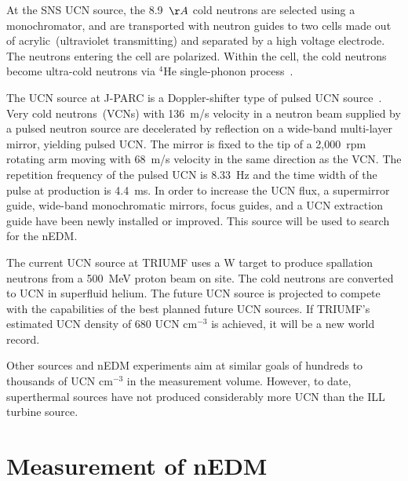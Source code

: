 At the SNS UCN source, the 8.9~$\AA$ cold neutrons are selected using
a monochromator, and are transported with neutron guides to two cells
made out of acrylic~(ultraviolet transmitting) and separated by a high
voltage electrode.  The neutrons entering the cell are
polarized. Within the cell, the cold neutrons become ultra-cold
neutrons via $^4$He single-phonon process~\cite{kolarkar2010}.


The UCN source at J-PARC is a Doppler-shifter type of pulsed UCN
source~\cite{Imajo2015}. Very cold neutrons~(VCNs) with 136~m/s
velocity in a neutron beam supplied by a pulsed neutron source are
decelerated by reflection on a wide-band multi-layer mirror, yielding
pulsed UCN. The mirror is fixed to the tip of a 2,000~rpm rotating arm
moving with 68~m/s velocity in the same direction as the VCN. The
repetition frequency of the pulsed UCN is 8.33~Hz and the time width
of the pulse at production is 4.4~ms. In order to increase the UCN
flux, a supermirror guide, wide-band monochromatic mirrors, focus
guides, and a UCN extraction guide have been newly installed or
improved. This source will be used to search for the nEDM.


The current UCN source at TRIUMF uses a W target to produce spallation
neutrons from a 500~MeV proton beam on site. The cold neutrons are
converted to UCN in superfluid helium.  The future UCN source is
projected to compete with the capabilities of the best planned future
UCN sources. If TRIUMF's estimated UCN density of 680 UCN cm$^{-3}$ is
achieved, it will be a new world record.

Other sources and nEDM experiments aim at similar goals of hundreds to
thousands of UCN cm$^{-3}$ in the measurement volume. However, to
date, superthermal sources have not produced considerably more UCN
than the ILL turbine source.


 





\section{Measurement of nEDM}

